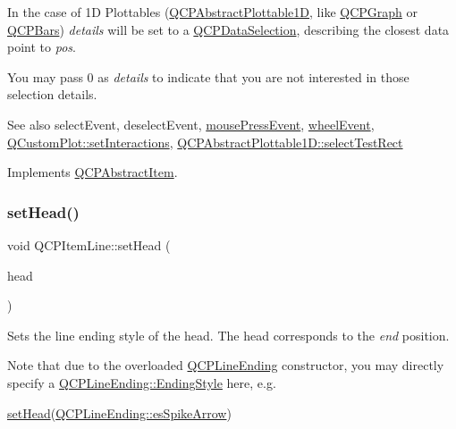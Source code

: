 In the case of 1D Plottables (\hyperlink{classQCPAbstractPlottable1D}{Q\+C\+P\+Abstract\+Plottable1D}, like \hyperlink{classQCPGraph}{Q\+C\+P\+Graph} or \hyperlink{classQCPBars}{Q\+C\+P\+Bars}) {\itshape details} will be set to a \hyperlink{classQCPDataSelection}{Q\+C\+P\+Data\+Selection}, describing the closest data point to {\itshape pos}.

You may pass 0 as {\itshape details} to indicate that you are not interested in those selection details.

\begin{DoxySeeAlso}{See also}
select\+Event, deselect\+Event, \hyperlink{classQCPLayerable_af6567604818db90f4fd52822f8bc8376}{mouse\+Press\+Event}, \hyperlink{classQCPLayerable_a47dfd7b8fd99c08ca54e09c362b6f022}{wheel\+Event}, \hyperlink{classQCustomPlot_a5ee1e2f6ae27419deca53e75907c27e5}{Q\+Custom\+Plot\+::set\+Interactions}, \hyperlink{classQCPAbstractPlottable1D_a22377bf6e57ab7eedbc9e489250c6ded}{Q\+C\+P\+Abstract\+Plottable1\+D\+::select\+Test\+Rect} 
\end{DoxySeeAlso}


Implements \hyperlink{classQCPAbstractItem_ae41d0349d68bb802c49104afd100ba2a}{Q\+C\+P\+Abstract\+Item}.

\mbox{\label{classQCPItemLine_aebf3d687114d584e0459db6759e2c3c3}} 
\subsubsection{\texorpdfstring{set\+Head()}{setHead()}}
{\footnotesize\ttfamily void Q\+C\+P\+Item\+Line\+::set\+Head (\begin{DoxyParamCaption}\item[{const \hyperlink{classQCPLineEnding}{Q\+C\+P\+Line\+Ending} \&}]{head }\end{DoxyParamCaption})}

Sets the line ending style of the head. The head corresponds to the {\itshape end} position.

Note that due to the overloaded \hyperlink{classQCPLineEnding}{Q\+C\+P\+Line\+Ending} constructor, you may directly specify a \hyperlink{classQCPLineEnding_a5ef16e6876b4b74959c7261d8d4c2cd5}{Q\+C\+P\+Line\+Ending\+::\+Ending\+Style} here, e.\+g.
\begin{DoxyCode}
\hyperlink{classQCPItemLine_aebf3d687114d584e0459db6759e2c3c3}{setHead}(\hyperlink{classQCPLineEnding_a5ef16e6876b4b74959c7261d8d4c2cd5ab9964d0d03f812d1e79de15edbeb2cbf}{QCPLineEnding::esSpikeArrow}) 
\end{DoxyCode}


